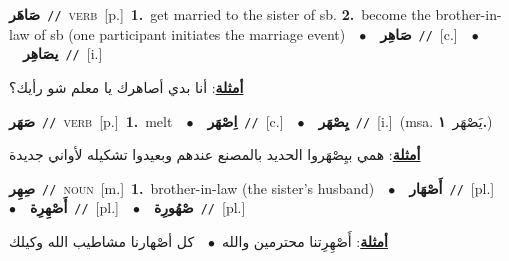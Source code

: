 \documentclass[10pt,a4paper,twoside]{article} %
\begin{document}
\begin{multicols}{2}
{\setlength\topsep{0pt}\textbf{\foreignlanguage{arabic}{صَاهَر}}\ {\color{gray}\texttt{//}\color{black}}\ \textsc{verb}\ [p.]\ \textbf{1.}~get married to the sister of sb.  \textbf{2.}~become the brother-in-law of sb (one participant initiates the marriage event)\ \ $\bullet$\ \ \setlength\topsep{0pt}\textbf{\foreignlanguage{arabic}{صَاهِر}}\ {\color{gray}\texttt{//}\color{black}}\ [c.]\ \ $\bullet$\ \ \setlength\topsep{0pt}\textbf{\foreignlanguage{arabic}{يصَاهِر}}\ {\color{gray}\texttt{//}\color{black}}\ [i.]\  \begin{flushright}\color{gray}\foreignlanguage{arabic}{\textbf{\underline{\foreignlanguage{arabic}{أمثلة}}}: أنا بدي أصاهرك يا معلم شو رأيك؟}\end{flushright}\color{black}} \vspace{2mm}

{\setlength\topsep{0pt}\textbf{\foreignlanguage{arabic}{صَهَر}}\ {\color{gray}\texttt{//}\color{black}}\ \textsc{verb}\ [p.]\ \textbf{1.}~melt\ \ $\bullet$\ \ \setlength\topsep{0pt}\textbf{\foreignlanguage{arabic}{اِصْهَر}}\ {\color{gray}\texttt{//}\color{black}}\ [c.]\ \ $\bullet$\ \ \setlength\topsep{0pt}\textbf{\foreignlanguage{arabic}{يِصْهَر}}\ {\color{gray}\texttt{//}\color{black}}\ [i.]\ \color{gray}(msa. \foreignlanguage{arabic}{يَصْهَر}~\foreignlanguage{arabic}{\textbf{١.}})\color{black}\  \begin{flushright}\color{gray}\foreignlanguage{arabic}{\textbf{\underline{\foreignlanguage{arabic}{أمثلة}}}: همي بيِصْهَروا الحديد بالمصنع عندهم وبعيدوا تشكيله لأواني جديدة}\end{flushright}\color{black}} \vspace{2mm}

{\setlength\topsep{0pt}\textbf{\foreignlanguage{arabic}{صِهِر}}\ {\color{gray}\texttt{//}\color{black}}\ \textsc{noun}\ [m.]\ \textbf{1.}~brother-in-law (the sister's husband)\ \ $\bullet$\ \ \setlength\topsep{0pt}\textbf{\foreignlanguage{arabic}{أَصْهَار}}\ {\color{gray}\texttt{//}\color{black}}\ [pl.]\ \ $\bullet$\ \ \setlength\topsep{0pt}\textbf{\foreignlanguage{arabic}{أَصْهِرِة}}\ {\color{gray}\texttt{//}\color{black}}\ [pl.]\ \ $\bullet$\ \ \setlength\topsep{0pt}\textbf{\foreignlanguage{arabic}{صْهُورِة}}\ {\color{gray}\texttt{//}\color{black}}\ [pl.]\  \begin{flushright}\color{gray}\foreignlanguage{arabic}{\textbf{\underline{\foreignlanguage{arabic}{أمثلة}}}: أَصْهِرِتنا محترمين والله\ $\bullet$\ \  كل أصْهارنا مشاطيب الله وكيلك}\end{flushright}\color{black}} \vspace{2mm}


\end{multicols}
\end{document}
